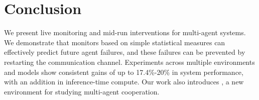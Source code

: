 \section{Conclusion}
We present live monitoring and mid-run interventions for multi-agent systems. We demonstrate that monitors based on simple statistical measures can effectively predict future agent failures, and these failures can be prevented by restarting the communication channel. Experiments across multiple environments and models show consistent gains of up to 17.4\%-20\% in system performance, with an addition in inference-time compute.
Our work also introduces \ourenv{}, a new environment for studying multi-agent cooperation.
